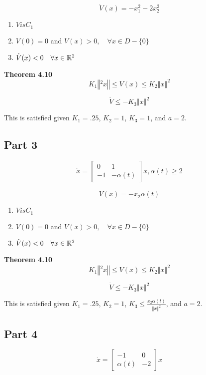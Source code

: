 $$
\dot{V}(x)=-x_{1}^{2}-2 x_{2}^{2}
$$


\begin{enumerate}
  \item $V is C_1$
  \item $V(0)= 0 $ and $V(x) > 0, \quad \forall x \in D - \{ 0\}$
  \item $\dot{V}(x) < 0 \quad \forall x \in \mathbb{R}^2$
\end{enumerate}

\noindent \textbf{Theorem 4.10}
$$
K_1 \left\Vert^2 x \right\Vert \leq V(x) \leq K_2 \left\Vert x \right\Vert^2
$$


$$
\dot{V} \leq -K_3 \left\Vert x \right\Vert^2
$$


\noindent This is satisfied given $K_1 = .25$, $K_2 =1 $, $K_3=1$, and $a =2$.


\subsection*{Part 3}

$$
\dot{x}=\left[\begin{array}{cc}
0 & 1 \\
-1 & -\alpha(t)
\end{array}\right] x, \alpha(t) \geq 2
$$



$$
\dot{V}(x)=-x_{2} \alpha(t)
$$



\begin{enumerate}
  \item $V is C_1$
  \item $V(0)= 0 $ and $V(x) > 0, \quad \forall x \in D - \{ 0\}$
  \item $\dot{V}(x) < 0 \quad \forall x \in \mathbb{R}^2$
\end{enumerate}

\noindent \textbf{Theorem 4.10}
$$
K_1 \left\Vert^2 x \right\Vert \leq V(x) \leq K_2 \left\Vert x \right\Vert^2
$$


$$
\dot{V} \leq -K_3 \left\Vert x \right\Vert^2
$$


\noindent This is satisfied given $K_1 = .25$, $K_2 =1 $, $K_3\leq \frac{x_2 \alpha(t)}{\left\Vert x\right\Vert^2}$, and $a =2$.

\subsection*{Part 4}


$$
\dot{x}=\left[\begin{array}{cc}
-1 & 0 \\
\alpha(t) & -2
\end{array}\right] x
$$



